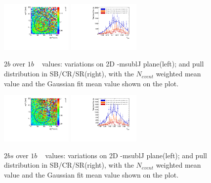 \begin{figure}[htbp!]
\begin{center}
\includegraphics[width=0.31\textwidth,angle=-90]{figures/boosted/AppendixMuqcdstudy/TwoTag_Incl_mH0H1.pdf}
\includegraphics[width=0.31\textwidth,angle=-90]{figures/boosted/AppendixMuqcdstudy/TwoTag_Incl_mH0H1_pull.pdf}
\caption{$2b$ over $1b$ \muqcd~ values: \muqcd variations on 2D \mleadJ-msublJ plane(left); and \muqcd pull distribution in SB/CR/SR(right), with the $N_{event}$ weighted mean value and the Gaussian fit mean value shown on the plot.}
\label{fig:app-muqcd-2b}
\end{center}
\end{figure}

\begin{figure}[htbp!]
\begin{center}
\includegraphics[width=0.31\textwidth,angle=-90]{figures/boosted/AppendixMuqcdstudy/TwoTag_split_Incl_mH0H1.pdf}
\includegraphics[width=0.31\textwidth,angle=-90]{figures/boosted/AppendixMuqcdstudy/TwoTag_split_Incl_mH0H1_pull.pdf}
\caption{$2bs$ over $1b$ \muqcd~ values: \muqcd variations on 2D \mleadJ-msublJ plane(left); and \muqcd pull distribution in SB/CR/SR(right), with the $N_{event}$ weighted mean value and the Gaussian fit mean value shown on the plot.}
\label{fig:app-muqcd-2bs}
\end{center}
\end{figure}

